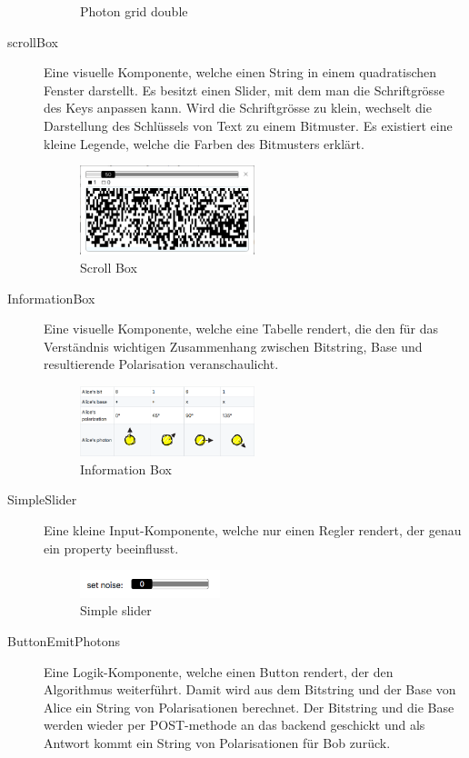 \documentclass[a4paper,10.2pt,pdftex]{scrartcl}%
\begin{document}
\begin{description}
\begin{figure}[h]
	\caption{Photon grid double}
\end{figure} 
\item[scrollBox] Eine visuelle Komponente, welche einen String in einem quadratischen Fenster darstellt. Es besitzt einen Slider, mit dem man die Schriftgrösse des Keys anpassen kann. Wird die Schriftgrösse zu klein, wechselt die Darstellung des Schlüssels von Text zu einem Bitmuster. Es existiert eine kleine Legende, welche die Farben des Bitmusters erklärt.
\begin{figure}[h]
	\centering
  \includegraphics[width=0.5\textwidth]{graphics/component_scroll_box.png}
	\caption{Scroll Box}
\end{figure}
\item[InformationBox] Eine visuelle Komponente, welche eine Tabelle rendert, die den für das Verständnis wichtigen Zusammenhang zwischen Bitstring, Base und resultierende Polarisation veranschaulicht.
\begin{figure}[h]
	\centering
  \includegraphics[width=0.5\textwidth]{graphics/component_information_box.png}
	\caption{Information Box}
\end{figure}
\item[SimpleSlider] Eine kleine Input-Komponente, welche nur einen Regler rendert, der genau ein property beeinflusst. 
\begin{figure}[h]
	\centering
  \includegraphics[width=0.4\textwidth]{graphics/component_simple_slider.png}
	\caption{Simple slider}
\end{figure}
\item[ButtonEmitPhotons] Eine Logik-Komponente, welche einen Button rendert, der den Algorithmus weiterführt. Damit wird aus dem Bitstring und der Base von Alice ein String von Polarisationen berechnet. Der Bitstring und die Base werden wieder per POST-methode an das backend geschickt und als Antwort kommt ein String von Polarisationen für Bob zurück.

\end{description}
\end{document}
